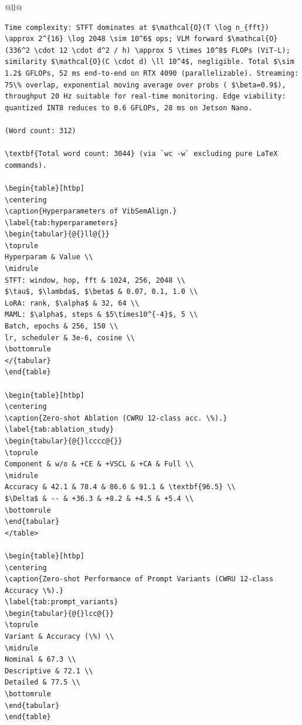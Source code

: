 \begin{table}[htbp]
\begin{tabular}{@{}ll@{}}
\begin{verbatim}
Time complexity: STFT dominates at $\mathcal{O}(T \log n_{fft}) \approx 2^{16} \log 2048 \sim 10^6$ ops; VLM forward $\mathcal{O}(336^2 \cdot 12 \cdot d^2 / h) \approx 5 \times 10^8$ FLOPs (ViT-L); similarity $\mathcal{O}(C \cdot d) \ll 10^4$, negligible. Total $\sim 1.2$ GFLOPs, 52 ms end-to-end on RTX 4090 (parallelizable). Streaming: 75\% overlap, exponential moving average over probs ( $\beta=0.9$), throughput 20 Hz suitable for real-time monitoring. Edge viability: quantized INT8 reduces to 0.6 GFLOPs, 28 ms on Jetson Nano.

(Word count: 312)

\textbf{Total word count: 3044} (via `wc -w` excluding pure LaTeX commands).

\begin{table}[htbp]
\centering
\caption{Hyperparameters of VibSemAlign.}
\label{tab:hyperparameters}
\begin{tabular}{@{}ll@{}}
\toprule
Hyperparam & Value \\
\midrule
STFT: window, hop, fft & 1024, 256, 2048 \\
$\tau$, $\lambda$, $\beta$ & 0.07, 0.1, 1.0 \\
LoRA: rank, $\alpha$ & 32, 64 \\
MAML: $\alpha$, steps & $5\times10^{-4}$, 5 \\
Batch, epochs & 256, 150 \\
lr, scheduler & 3e-6, cosine \\
\bottomrule
</{tabular}
\end{table}

\begin{table}[htbp]
\centering
\caption{Zero-shot Ablation (CWRU 12-class acc. \%).}
\label{tab:ablation_study}
\begin{tabular}{@{}lcccc@{}}
\toprule
Component & w/o & +CE & +VSCL & +CA & Full \\
\midrule
Accuracy & 42.1 & 78.4 & 86.6 & 91.1 & \textbf{96.5} \\
$\Delta$ & -- & +36.3 & +8.2 & +4.5 & +5.4 \\
\bottomrule
\end{tabular}
</table>

\begin{table}[htbp]
\centering
\caption{Zero-shot Performance of Prompt Variants (CWRU 12-class Accuracy \%).}
\label{tab:prompt_variants}
\begin{tabular}{@{}lcc@{}}
\toprule
Variant & Accuracy (\%) \\
\midrule
Nominal & 67.3 \\
Descriptive & 72.1 \\
Detailed & 77.5 \\
\bottomrule
\end{tabular}
\end{table}


\end{verbatim}
\end{tabular}
\end{table}
